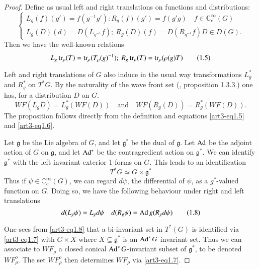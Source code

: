 \begin{proof}
Define as usual left and right translations on functions and distributions:
\begin{equation*}
\begin{cases}
L_{g}(f)(g')=f(g^{-1}g'):R_{g}(f)(g')=f(g'g)\quad f\in \mathbb{C}^{\infty}_{c}(G)\\
L_{g}(D)(d)=D(L_{g^{-1}}f); \ R_{g}(D)(f)=D(R_{g^{-1}}f)D\in D(G).
\end{cases}\tag{1.4}\label{art3-eq1.4}
\end{equation*}
Then we have the well-known relations
\begin{equation*}
L_{g}\tr_{\rho}(T)=\tr_{\rho}(T_{\rho}(g)^{-1}); \ R_{g}\tr_{\rho}(T)=\tr_{\rho}(\rho(g)T)\tag{1.5}\label{art3-eq1.5}
\end{equation*}

Left and right translations of $G$ also induce in the usual way transformations $L^{*}_{g}$ and $R^{*}_{g}$ on $T^{*}G$. By the naturality of the wave front set (\cite{art3-D}, proposition 1.3.3.) one has, for a distribution $D$ on $G$.
\begin{equation*}
WF(L_{g}D)=L_{g}^{*}(WF(D))\quad\text{and}\quad WF(R_{g}(D))=R_{g}^{*}(WF(D)).\tag{1.6}\label{art3-eq1.6}
\end{equation*}
The proposition follows directly from the definition and equations \eqref{art3-eq1.5} and \eqref{art3-eq1.6}.

Let $\mathfrak{g}$ be the Lie algebra of $G$, and let $\mathfrak{g}^{*}$ be the dual of $\mathfrak{g}$. Let $\operatorname{Ad}$ be the adjoint action of $G$ on $\mathfrak{g}$, and let $\operatorname{Ad}^{*}$ be the contragredient action on $\mathfrak{g}^{*}$. We can identify $\mathfrak{g}^{*}$ with the left invariant exterior 1-forms on $G$. This leads to an identification
\begin{equation*}
T^{*}G\simeq G\times \mathfrak{g}^{*}\tag{1.7}\label{art3-eq1.7}
\end{equation*}\pageoriginale
Thus if $\psi\in \mathbb{C}^{\infty}_{c}(G)$, we can regard $d\psi$, the differential of $\psi$, as a $g^{*}$-valued function on $G$. Doing so, we have the following behaviour under right and left translations
\begin{equation*}
d(L_{g}\psi)=L_{g}d\psi\quad d(R_{g}\psi)=\operatorname{Ad} g(R_{g}d\psi)\tag{1.8}\label{art3-eq1.8}
\end{equation*}

One sees from \eqref{art3-eq1.8} that a bi-invariant set in $T^{*}(G)$ is identified via \eqref{art3-eq1.7} with $G\times X$ where $X\subseteq \mathfrak{g}^{*}$ is an $\operatorname{Ad}^{*}G$ invariant set. Thus we can associate to $WF_{\rho}$ a closed conical $\operatorname{Ad}^{*}G$-invariant subset of $\mathfrak{g}^{*}$, to be denoted $WF^{o}_{\rho}$. The set $WF^{o}_{\rho}$ then determines $WF_{\rho}$ via \eqref{art3-eq1.7}.


\end{proof}
